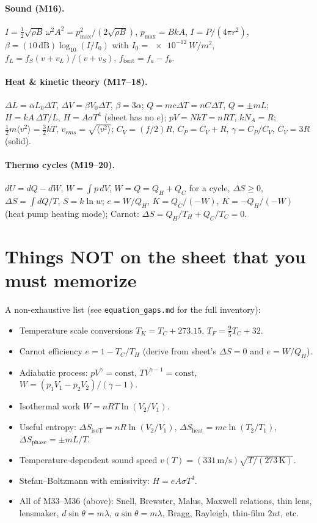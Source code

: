 \documentclass[11pt]{article}
\begin{document}
\paragraph{Sound (M16).}
$I = \tfrac{1}{2}\sqrt{\rho B}\,\omega^2 A^2 = p_{\max}^2/(2\sqrt{\rho B})$,
$p_{\max} = BkA$,
$I = P/(4\pi r^2)$,
$\beta = (10\,\text{dB})\log_{10}(I/I_0)$ with $I_0 = \SI{e-12}{W/m^2}$,
$f_L = f_S(v+v_L)/(v+v_S)$,
$f_{\text{beat}} = f_a - f_b$.

\paragraph{Heat \& kinetic theory (M17--18).}
$\Delta L = \alpha L_0\Delta T$, $\Delta V = \beta V_0\Delta T$, $\beta = 3\alpha$;
$Q = mc\Delta T = nC\Delta T$, $Q = \pm mL$;
$H = kA\,\Delta T/L$, $H = A\sigma T^4$ (sheet has no $e$);
$pV = NkT = nRT$, $kN_A = R$;
$\tfrac{1}{2}m\langle v^2\rangle = \tfrac{3}{2}kT$, $v_{rms} = \sqrt{\langle v^2\rangle}$;
$C_V = (f/2)R$, $C_P = C_V + R$, $\gamma = C_P/C_V$, $C_V = 3R$ (solid).

\paragraph{Thermo cycles (M19--20).}
$dU = dQ - dW$,
$W = \int p\,dV$,
$W = Q = Q_H + Q_C$ for a cycle,
$\Delta S \ge 0$,
$\Delta S = \int dQ/T$,
$S = k\ln w$;
$e = W/Q_H$,
$K = Q_C/(-W)$,
$K = -Q_H/(-W)$ (heat pump heating mode);
Carnot: $\Delta S = Q_H/T_H + Q_C/T_C = 0$.

\section*{Things NOT on the sheet that you must memorize}

A non-exhaustive list (see \texttt{equation\_gaps.md} for the full inventory):
\begin{itemize}\itemsep0pt
  \item Temperature scale conversions $T_K = T_C + 273.15$, $T_F = \tfrac{9}{5}T_C + 32$.
  \item Carnot efficiency $e = 1 - T_C/T_H$ (derive from sheet's $\Delta S = 0$ and $e = W/Q_H$).
  \item Adiabatic process: $pV^\gamma = \text{const}$, $TV^{\gamma-1} = \text{const}$, $W = (p_1V_1 - p_2V_2)/(\gamma - 1)$.
  \item Isothermal work $W = nRT\ln(V_2/V_1)$.
  \item Useful entropy: $\Delta S_{\text{isoT}} = nR\ln(V_2/V_1)$, $\Delta S_{\text{heat}} = mc\ln(T_2/T_1)$, $\Delta S_{\text{phase}} = \pm mL/T$.
  \item Temperature-dependent sound speed $v(T) = (331\,\text{m/s})\sqrt{T/(273\,\text{K})}$.
  \item Stefan--Boltzmann with emissivity: $H = e A\sigma T^4$.
  \item All of M33--M36 (above): Snell, Brewster, Malus, Maxwell relations, thin lens, lensmaker, $d\sin\theta=m\lambda$, $a\sin\theta=m\lambda$, Bragg, Rayleigh, thin-film $2nt$, etc.
\end{itemize}
\end{document}
